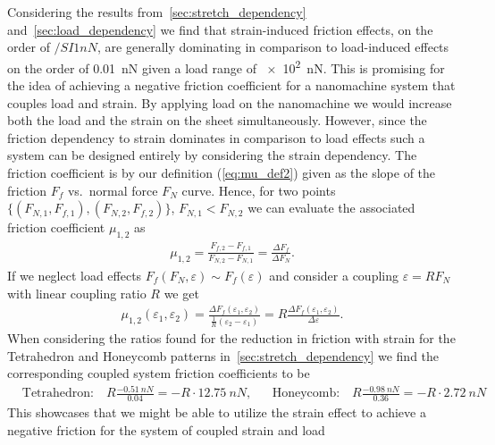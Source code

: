 Considering the results from~\cref{sec:stretch_dependency} and~\cref{sec:load_dependency} we find that strain-induced friction effects, on the order of $/SI{1}{nN}$, are generally dominating in comparison to load-induced effects on the order of \SI{0.01}{nN} given a load range of \SI{e2}{nN}. This is promising for the idea of achieving a negative friction coefficient for a nanomachine system that couples load and strain. By applying load on the nanomachine we would increase both the load and the strain on the sheet simultaneously. However, since the friction dependency to strain dominates in comparison to load effects such a system can be designed entirely by considering the strain dependency. The friction coefficient is by our definition (\cref{eq:mu_def2}) given as the slope of the friction $F_f$ vs.\ normal force $F_N$ curve. Hence, for two points $\{(F_{N,1}, F_{f,1}), (F_{N,2}, F_{f,2})\}$, $F_{N,1} < F_{N,2}$ we can evaluate the associated friction coefficient $\mu_{1,2}$ as 
\begin{align*}
  \mu_{1,2} = \frac{F_{f,2} - F_{f,1}}{F_{N,2} - F_{N,1}} = \frac{\Delta F_f}{\Delta F_N}.
\end{align*}
If we neglect load effects $F_f(F_N, \varepsilon) \sim F_f(\varepsilon)$ and consider a coupling $\varepsilon = R F_N$ with linear coupling ratio $R$ we get 
\begin{align}
  \mu_{1,2}(\varepsilon_1, \varepsilon_2) = \frac{\Delta F_{f}(\varepsilon_1, \varepsilon_2)}{\frac{1}{R}(\varepsilon_2 - \varepsilon_1)} = R\frac{\Delta F_{f}(\varepsilon_1, \varepsilon_2)}{\Delta \varepsilon}.
  \label{eq:mu_strain}
\end{align}
When considering the ratios found for the reduction in friction with strain for the Tetrahedron and Honeycomb patterns in~\cref{sec:stretch_dependency} we find the corresponding coupled system friction coefficients to be 
\begin{align}
  &\text{Tetrahedron:} \quad R\frac{-\SI{0.51}{nN}}{0.04} = -R\cdot\SI{12.75}{nN},& &\text{Honeycomb:} \quad R\frac{-\SI{0.98}{nN}}{0.36} = -R\cdot\SI{2.72}{nN}&
  \label{eq:pilot_study_mu_estimate}
\end{align}
This showcases that we might be able to utilize the strain effect to achieve a negative friction for the system of coupled strain and load







